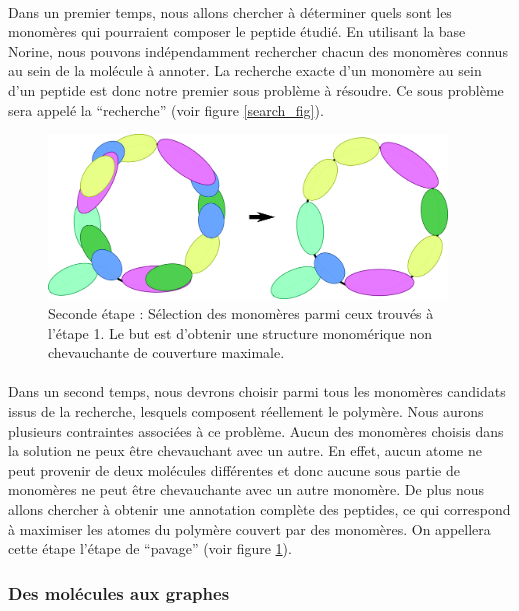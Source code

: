\documentclass[12pt,french,twoside]{report}
\begin{document}
\paragraph{}Dans un premier temps, nous allons chercher à déterminer quels sont les monomères qui pourraient composer le peptide étudié.
En utilisant la base Norine, nous pouvons indépendamment rechercher chacun des monomères connus au sein de la molécule à annoter.
La recherche exacte d'un monomère au sein d'un peptide est donc notre premier sous problème à résoudre.
Ce sous problème sera appelé la ``recherche'' (voir figure \ref{search_fig}).

\begin{figure}[!ht]
  \begin{center}
    \includegraphics[width=400px]{Figures/s2m/Intro/tiling.png}
    \caption{\label{tiling_fig}Seconde étape : Sélection des monomères parmi ceux trouvés à l'étape 1.
    Le but est d'obtenir une structure monomérique non chevauchante de couverture maximale.}
  \end{center}
\end{figure}

\paragraph{}Dans un second temps, nous devrons choisir parmi tous les monomères candidats issus de la recherche, lesquels composent réellement le polymère.
Nous aurons plusieurs contraintes associées à ce problème.
Aucun des monomères choisis dans la solution ne peux être chevauchant avec un autre.
En effet, aucun atome ne peut provenir de deux molécules différentes et donc aucune sous partie de monomères ne peut être chevauchante avec un autre monomère.
De plus nous allons chercher à obtenir une annotation complète des peptides, ce qui correspond à maximiser les atomes du polymère couvert par des monomères.
On appellera cette étape l'étape de ``pavage'' (voir figure \ref{tiling_fig}).

\subsubsection{Des molécules aux graphes}
\end{document}
